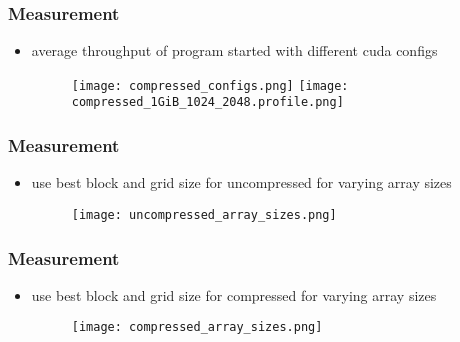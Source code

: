 \documentclass{beamer}
\begin{document}
\begin{frame}
    \frametitle{Measurement}
    \begin{itemize}
        \item average throughput of program started with different cuda configs
         \begin{figure}
             \centering
             \texttt{[image: compressed\_configs.png]} %
             \texttt{[image: compressed\_1GiB\_1024\_2048.profile.png]} %
         \end{figure}
    \end{itemize}
\end{frame}

\begin{frame}
    \frametitle{Measurement}
    \begin{itemize}
        \item use best block and grid size for uncompressed for varying array sizes
         \begin{figure}
             \centering
             \texttt{[image: uncompressed\_array\_sizes.png]} %
         \end{figure}
    \end{itemize}
\end{frame}

\begin{frame}
    \frametitle{Measurement}
    \begin{itemize}
        \item use best block and grid size for compressed for varying array sizes
         \begin{figure}
             \centering
             \texttt{[image: compressed\_array\_sizes.png]} %
         \end{figure}
    \end{itemize}
\end{frame}
\end{document}
